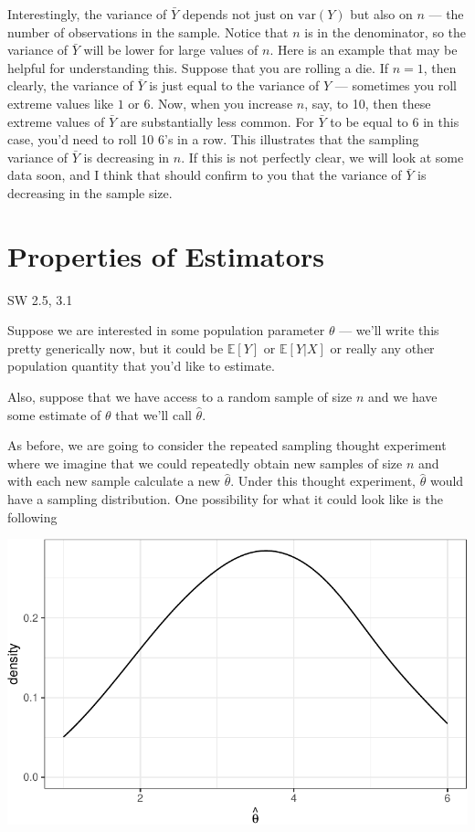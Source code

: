 \documentclass[
  letterpaper,
  DIV=11,
  numbers=noendperiod]{scrreprt}
\begin{document}
Interestingly, the variance of \(\bar{Y}\) depends not just on
\(\mathrm{var}(Y)\) but also on \(n\) --- the number of observations in
the sample. Notice that \(n\) is in the denominator, so the variance of
\(\bar{Y}\) will be lower for large values of \(n\). Here is an example
that may be helpful for understanding this. Suppose that you are rolling
a die. If \(n=1\), then clearly, the variance of \(\bar{Y}\) is just
equal to the variance of \(Y\) --- sometimes you roll extreme values
like \(1\) or \(6\). Now, when you increase \(n\), say, to 10, then
these extreme values of \(\bar{Y}\) are substantially less common. For
\(\bar{Y}\) to be equal to \(6\) in this case, you'd need to roll 10
\(6\)'s in a row. This illustrates that the sampling variance of
\(\bar{Y}\) is decreasing in \(n\). If this is not perfectly clear, we
will look at some data soon, and I think that should confirm to you that
the variance of \(\bar{Y}\) is decreasing in the sample size.

\section{Properties of Estimators}\label{properties-of-estimators-1}

SW 2.5, 3.1

Suppose we are interested in some population parameter \(\theta\) ---
we'll write this pretty generically now, but it could be
\(\mathbb{E}[Y]\) or \(\mathbb{E}[Y|X]\) or really any other population
quantity that you'd like to estimate.

Also, suppose that we have access to a random sample of size \(n\) and
we have some estimate of \(\theta\) that we'll call \(\hat{\theta}\).

As before, we are going to consider the repeated sampling thought
experiment where we imagine that we could repeatedly obtain new samples
of size \(n\) and with each new sample calculate a new \(\hat{\theta}\).
Under this thought experiment, \(\hat{\theta}\) would have a sampling
distribution. One possibility for what it could look like is the
following

\includegraphics{03-estimators_files/figure-pdf/unnamed-chunk-1-1.pdf}
\end{document}
